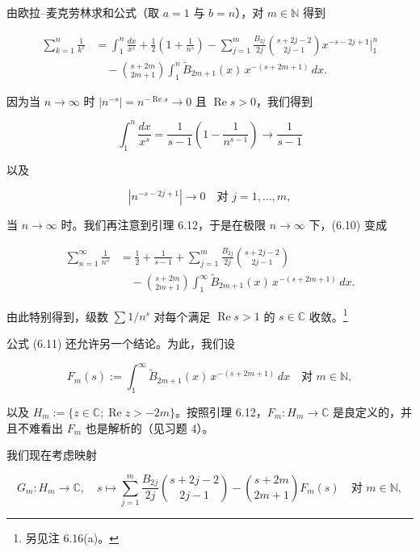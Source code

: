 由欧拉–麦克劳林求和公式（取 $ a = 1 $ 与 $ b = n $），对 $ m \in \mathbb{N} $ 得到

\begin{equation}
\begin{aligned}
\sum_{k=1}^{n}\frac{1}{k^s} &= \int_1^n \frac{dx}{x^s} + \frac{1}{2}\left( 1 + \frac{1}{n^s} \right) - \sum_{j=1}^{m}\frac{B_{2j}}{2j}\binom{s+2j-2}{2j-1}x^{-s-2j+1}\Big|_1^n \\ &\quad - \binom{s+2m}{2m+1}\int_1^n \widetilde{B}_{2m+1}(x)\,x^{-(s+2m+1)}\,dx .
\end{aligned}\tag{6.10}
\end{equation}

因为当 $ n \to \infty $ 时 $ |n^{-s}| = n^{-\operatorname{Re} s} \to 0 $ 且 $ \operatorname{Re} s > 0 $，我们得到

\[
\int_1^n \frac{dx}{x^s} = \frac{1}{s-1}\left( 1 - \frac{1}{n^{s-1}} \right) \to \frac{1}{s-1}
\]

以及

\[
|n^{-s-2j+1}| \to 0 \quad \text{对 } j = 1, \ldots, m ,
\]

当 $ n \to \infty $ 时。我们再注意到引理 6.12，于是在极限 $ n \to \infty $ 下，(6.10) 变成

\begin{equation}
\begin{aligned}
\sum_{n=1}^{\infty}\frac{1}{n^s} &= \frac{1}{2} + \frac{1}{s-1} + \sum_{j=1}^{m}\frac{B_{2j}}{2j}\binom{s+2j-2}{2j-1} \\ &\quad - \binom{s+2m}{2m+1}\int_1^\infty \widetilde{B}_{2m+1}(x)\,x^{-(s+2m+1)}\,dx .
\end{aligned}\tag{6.11}
\end{equation}

由此特别得到，级数 $ \sum 1/n^s $ 对每个满足 $ \operatorname{Re} s > 1 $ 的 $ s \in \mathbb{C} $ 收敛。\footnote{另见注 6.16(a)。}

公式 (6.11) 还允许另一个结论。为此，我们设

\[
F_m(s) := \int_1^\infty \widetilde{B}_{2m+1}(x)\,x^{-(s+2m+1)}\,dx \quad \text{对 } m \in \mathbb{N} ,
\]

以及 $ H_m := \{ z \in \mathbb{C} ; \operatorname{Re} z > -2m \} $。按照引理 6.12，$ F_m : H_m \to \mathbb{C} $ 是良定义的，并且不难看出 $ F_m $ 也是解析的（见习题 4）。

我们现在考虑映射

\[
G_m : H_m \to \mathbb{C} , \quad s \mapsto \sum_{j=1}^{m}\frac{B_{2j}}{2j}\binom{s+2j-2}{2j-1} - \binom{s+2m}{2m+1}F_m(s) \quad \text{对 } m \in \mathbb{N} ,
\]

